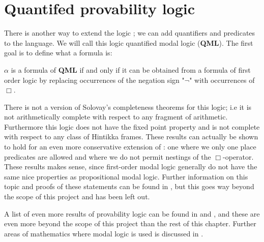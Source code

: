 \documentclass[../main.tex]{subfiles}
\begin{document}
\section{Quantifed provability logic}
There is another way to extend the logic \GL; we can add quantifiers and
predicates to the
language. We will call this logic  quantified modal logic (\textbf{QML}). The first
goal is to define what a formula is:
\begin{defi}
	$\alpha$ is a formula of \textbf{QML} if and only if it can be obtained from a
	formula of first order logic by
	replacing occurrences of the negation sign "$\neg$" with occurrences of
	$\Box$. 
\end{defi}

	There is not a version of Solovay's completeness theorems for this
	logic; i.e it is not arithmetically complete with respect to any
	fragment of arithmetic. Furthermore this logic  does not have the fixed point property and
	is not complete with respect to any class of Hintikka frames. These
	results can actually be shown to hold for an even more conservative
	extension of \GL: one where we only one place predicates are
	allowed and where we do not permit nestings of the $\Box$-operator.
	These results makes sense, since first-order modal logic generally do
	not have the same nice properties as propositional modal logic.
	Further
	information on this topic and proofs of these statements can be found
	in \citet{Boolos1993}, but this goes way beyond the scope of this
	project and has been left out.

	A list of even more results of provability logic can be found
	in \citet{sep-logic-provability} and \citet{ArteBe}, and these
	are even more beyond the scope of this project than the rest of this
	chapter. Further areas of mathematics where modal logic is used is
	discussed in \citet{Artemov2007}.
	
\end{document}
